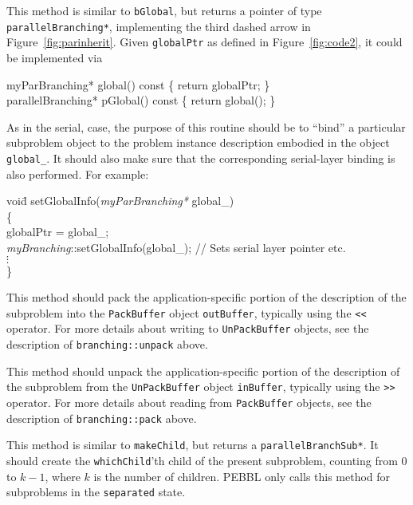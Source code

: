 This method is similar to \texttt{bGlobal}, but returns a pointer of
type \texttt{parallelBranching*}, implementing the third dashed arrow
in Figure~\ref{fig:parinherit}.  Given \texttt{globalPtr} as defined
in Figure~\ref{fig:code2}, it could be implemented via
\begin{codeblock}
myParBranching* global() const \{ return globalPtr; \} \\
parallelBranching* pGlobal() const \{ return global(); \}
\end{codeblock}

As in the
serial, case, the purpose of this routine should be to ``bind'' a
particular subproblem object to the problem instance description embodied in
the object \texttt{global\_}.  It should also make sure that the
corresponding serial-layer binding is also performed.  For example:
\begin{codeblock}
voi\=d setGlobalInfo(\emph{myParBranching*} global\_) \\
\{ \\
\> globalPtr = global\_; \\
\> \emph{myBranching}::setGlobalInfo(global\_);
  // Sets serial layer pointer etc. \\
\> $\vdots$\\
\}
\end{codeblock}

This method should pack the application-specific portion of the 
description of the subproblem into the \texttt{PackBuffer} object
\texttt{outBuffer}, typically using the \texttt{<<} operator.  For
more details about writing to \texttt{UnPackBuffer} objects, see the
description of \texttt{branching::unpack} above.

This method should unpack the application-specific portion of the
description of the subproblem from the \texttt{UnPackBuffer} object
\texttt{inBuffer}, typically using the \texttt{>>} operator.  For
more details about reading from \texttt{PackBuffer} objects, see the
description of \texttt{branching::pack} above.

This method is similar to \texttt{makeChild}, but returns a
\texttt{parallelBranchSub*}.  It should create the
\texttt{whichChild}'th child of the present subproblem, counting from
$0$ to $k-1$, where $k$ is the number of children.  PEBBL only calls
this method for subproblems in the \texttt{separated} state.

